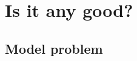 \documentclass[@BEAMER_OPTIONS@]{beamer}
\begin{document}
\note{ }

\section{Is it any good?}

\begin{frame}{}
\end{frame}

\note{ }

\subsection{Model problem}

\end{document}

